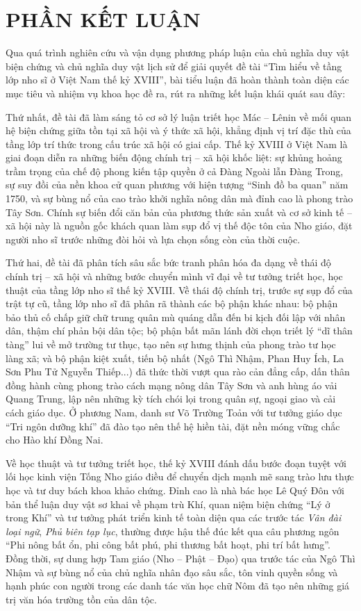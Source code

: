 \section*{PHẦN KẾT LUẬN}

Qua quá trình nghiên cứu và vận dụng phương pháp luận của chủ nghĩa duy vật biện chứng và chủ nghĩa duy vật lịch sử để giải quyết đề tài ``Tìm hiểu về tầng lớp nho sĩ ở Việt Nam thế kỷ XVIII'', bài tiểu luận đã hoàn thành toàn diện các mục tiêu và nhiệm vụ khoa học đề ra, rút ra những kết luận khái quát sau đây:

Thứ nhất, đề tài đã làm sáng tỏ cơ sở lý luận triết học Mác -- Lênin về mối quan hệ biện chứng giữa tồn tại xã hội và ý thức xã hội, khẳng định vị trí đặc thù của tầng lớp trí thức trong cấu trúc xã hội có giai cấp. Thế kỷ XVIII ở Việt Nam là giai đoạn diễn ra những biến động chính trị -- xã hội khốc liệt: sự khủng hoảng trầm trọng của chế độ phong kiến tập quyền ở cả Đàng Ngoài lẫn Đàng Trong, sự suy đồi của nền khoa cử quan phương với hiện tượng ``Sinh đồ ba quan'' năm 1750, và sự bùng nổ của cao trào khởi nghĩa nông dân mà đỉnh cao là phong trào Tây Sơn. Chính sự biến đổi căn bản của phương thức sản xuất và cơ sở kinh tế -- xã hội này là nguồn gốc khách quan làm sụp đổ vị thế độc tôn của Nho giáo, đặt người nho sĩ trước những đòi hỏi và lựa chọn sống còn của thời cuộc.

Thứ hai, đề tài đã phân tích sâu sắc bức tranh phân hóa đa dạng về thái độ chính trị -- xã hội và những bước chuyển mình vĩ đại về tư tưởng triết học, học thuật của tầng lớp nho sĩ thế kỷ XVIII. Về thái độ chính trị, trước sự sụp đổ của trật tự cũ, tầng lớp nho sĩ đã phân rã thành các bộ phận khác nhau: bộ phận bảo thủ cố chấp giữ chữ trung quân mù quáng dẫn đến bi kịch đối lập với nhân dân, thậm chí phản bội dân tộc; bộ phận bất mãn lánh đời chọn triết lý ``dĩ thân tàng'' lui về mở trường tư thục, tạo nên sự hưng thịnh của phong trào tư học làng xã; và bộ phận kiệt xuất, tiến bộ nhất (Ngô Thì Nhậm, Phan Huy Ích, La Sơn Phu Tử Nguyễn Thiếp...) đã thức thời vượt qua rào cản đẳng cấp, dấn thân đồng hành cùng phong trào cách mạng nông dân Tây Sơn và anh hùng áo vải Quang Trung, lập nên những kỳ tích chói lọi trong quân sự, ngoại giao và cải cách giáo dục. Ở phương Nam, danh sư Võ Trường Toản với tư tưởng giáo dục ``Tri ngôn dưỡng khí'' đã đào tạo nên thế hệ hiền tài, đặt nền móng vững chắc cho Hào khí Đồng Nai.

Về học thuật và tư tưởng triết học, thế kỷ XVIII đánh dấu bước đoạn tuyệt với lối học kinh viện Tống Nho giáo điều để chuyển dịch mạnh mẽ sang trào lưu thực học và tư duy bách khoa khảo chứng. Đỉnh cao là nhà bác học Lê Quý Đôn với bản thể luận duy vật sơ khai về phạm trù Khí, quan niệm biện chứng ``Lý ở trong Khí'' và tư tưởng phát triển kinh tế toàn diện qua các trước tác \textit{Vân đài loại ngữ}, \textit{Phủ biên tạp lục}, thường được hậu thế đúc kết qua câu phương ngôn ``Phi nông bất ổn, phi công bất phú, phi thương bất hoạt, phi trí bất hưng''. Đồng thời, sự dung hợp Tam giáo (Nho -- Phật -- Đạo) qua trước tác của Ngô Thì Nhậm và sự bùng nổ của chủ nghĩa nhân đạo sâu sắc, tôn vinh quyền sống và hạnh phúc con người trong các danh tác văn học chữ Nôm đã tạo nên những giá trị văn hóa trường tồn của dân tộc.

